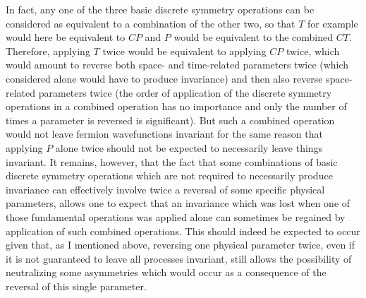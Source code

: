 \documentclass[notitlepage,12pt]{report}
\begin{document}
In fact, any one of the three basic discrete symmetry operations can be considered as equivalent to a combination of the other two, so that $T$ for example would here be equivalent to $CP$ and $P$ would be equivalent to the combined $CT$. Therefore, applying $T$ twice would be equivalent to applying $CP$ twice, which would amount to reverse both space- and time-related parameters twice (which considered alone would have to produce invariance) and then also reverse space-related parameters twice (the order of application of the discrete symmetry operations in a combined operation has no importance and only the number of times a parameter is reversed is significant). But such a combined operation would not leave fermion wavefunctions invariant for the same reason that applying $P$ alone twice should not be expected to necessarily leave things invariant. It remains, however, that the fact that some combinations of basic discrete symmetry operations which are not required to necessarily produce invariance can effectively involve twice a reversal of some specific physical parameters, allows one to expect that an invariance which was lost when one of those fundamental operations was applied alone can sometimes be regained by application of such combined operations. This should indeed be expected to occur given that, as I mentioned above, reversing one physical parameter twice, even if it is not guaranteed to leave all processes invariant, still allows the possibility of neutralizing some asymmetries which would occur as a consequence of the reversal of this single parameter.
\end{document}
